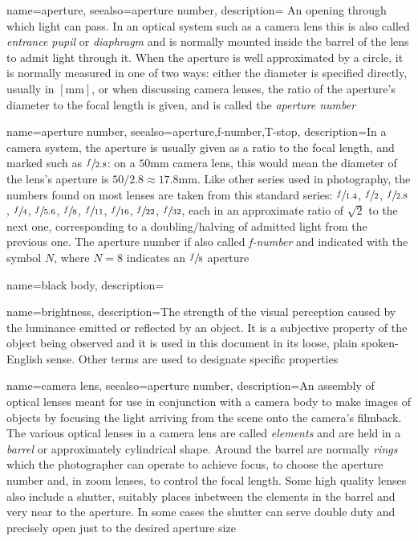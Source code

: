 {
	name=aperture,
	seealso={aperture number},
	description={
		An opening through which light can pass. 
		In an optical system such as a camera lens this is also called 
		\textsl{entrance pupil} or \textsl{diaphragm} and is normally
		mounted inside the barrel of the lens to admit light through it. 
		When the aperture is well approximated by a circle, it is normally measured 
		in one of two ways: either the diameter is specified directly, 
		usually in $[\unit{\milli\meter}]$, or when discussing camera lenses, the ratio 
		of the aperture's diameter to the focal length is given, 
		and is called the \textsl{aperture number}}
}

{
	name={aperture number},
	seealso={aperture,f-number,T-stop},
	description={In a camera system, the aperture is usually given as a ratio to the
		focal length, and marked such as $\sfrac{f}{2.8}$: on a $50\unit{\milli\meter}$ 
		camera lens, this would mean the diameter of the lens's aperture 
		is $50 / 2.8 \approx 17.8\unit{\milli\meter}$. 
		Like other series used in photography, the
		numbers found on most lenses are taken from this standard series:
		$\sfrac{f}{1.4}$, $\sfrac{f}{2}$, $\sfrac{f}{2.8}$, $\sfrac{f}{4}$, $\sfrac{f}{5.6}$,
		$\sfrac{f}{8}$, $\sfrac{f}{11}$, $\sfrac{f}{16}$, $\sfrac{f}{22}$, $\sfrac{f}{32}$,
		each in an approximate ratio of $\sqrt{2}$ to the next one, corresponding to a doubling/halving of admitted light from the previous one.
	    The aperture number if also called \textsl{f-number} and indicated with the symbol
    	$N$, where $N=8$ indicates an $\sfrac{f}{8}$ aperture}
}

{
	name={black body},
	description=\nopostdesc
}

{
  name=brightness,
  description={The strength of the visual perception caused by the luminance emitted or
    reflected by an object. It is a subjective property of the object being
    observed and it is used in this document in its loose, 
    plain spoken-English sense. 
    Other terms are used to designate specific properties}
}

{
	name={camera lens},
	seealso={aperture number},
	description={An assembly of optical lenses meant for use in conjunction with a 
		camera body to make images of objects by focusing the light arriving from the scene
		onto the camera's filmback. 
		The various optical lenses in a camera lens are called \textsl{elements} and 
		are held in a \textsl{barrel} or approximately cylindrical shape.
		Around the barrel are normally \textsl{rings} which the photographer can
		operate to achieve focus, to choose the aperture number and, in zoom lenses, to
		control the focal length.
		Some high quality lenses also include a shutter, suitably places inbetween the
		elements in the barrel and very near to the aperture. In some cases the shutter 
		can serve double duty and precisely open just to the desired aperture size}
}

